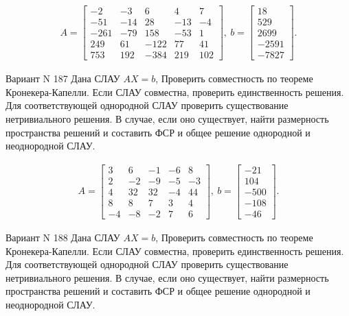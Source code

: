 \documentclass[11pt]{report}
\begin{document}
\begin{align*}
 A = \left[\begin{matrix}-2 & -3 & 6 & 4 & 7\\-51 & -14 & 28 & -13 & -4\\-261 & -79 & 158 & -53 & 1\\249 & 61 & -122 & 77 & 41\\753 & 192 & -384 & 219 & 102\end{matrix}\right],
\ b = \left[\begin{matrix}18\\529\\2699\\-2591\\-7827\end{matrix}\right]. 
 \end{align*}

Вариант N 187
Дана СЛАУ $AX = b$,
Проверить совместность по теореме Кронекера-Капелли. Если СЛАУ совместна, проверить единственность решения.
Для соответствующей однородной СЛАУ проверить существование нетривиального решения. В случае, если оно существует,
найти размерность пространства решений и составить ФСР и общее решение однородной  и неоднородной СЛАУ.


\begin{align*}
 A = \left[\begin{matrix}3 & 6 & -1 & -6 & 8\\2 & -2 & -9 & -5 & -3\\4 & 32 & 32 & -4 & 44\\8 & 8 & 7 & 3 & 4\\-4 & -8 & -2 & 7 & 6\end{matrix}\right],
\ b = \left[\begin{matrix}-21\\104\\-500\\-108\\-46\end{matrix}\right]. 
 \end{align*}

Вариант N 188
Дана СЛАУ $AX = b$,
Проверить совместность по теореме Кронекера-Капелли. Если СЛАУ совместна, проверить единственность решения.
Для соответствующей однородной СЛАУ проверить существование нетривиального решения. В случае, если оно существует,
найти размерность пространства решений и составить ФСР и общее решение однородной  и неоднородной СЛАУ.
\end{document}
